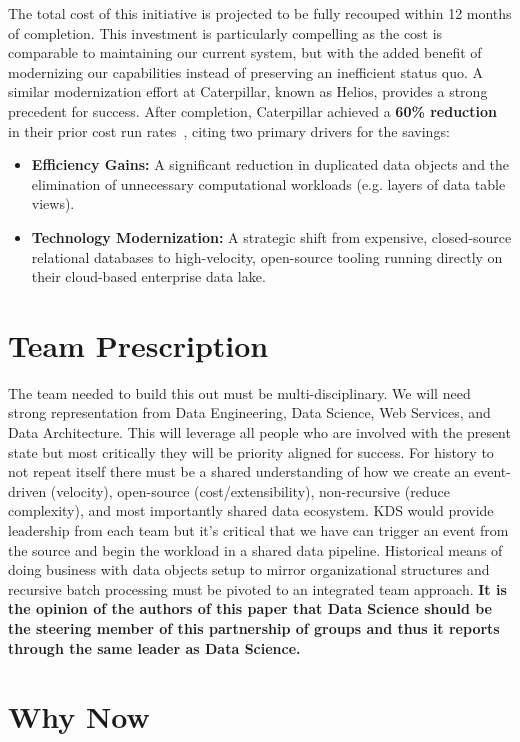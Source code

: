 \documentclass{article}
\begin{document}
The total cost of this initiative is projected to be fully recouped within 12 months of completion. This investment is particularly compelling as the cost is comparable to maintaining our current system, but with the added benefit of modernizing our capabilities instead of preserving an inefficient status quo.  A similar modernization effort at Caterpillar, known as Helios, provides a strong precedent for success. After completion, Caterpillar achieved a \textbf{60\% reduction} in their prior cost run rates~\cite{helios2025}, citing two primary drivers for the savings:
        \begin{itemize}
            \item \textbf{Efficiency Gains:} A significant reduction in duplicated data objects and the elimination of unnecessary computational workloads (e.g. layers of data table views).
            \item \textbf{Technology Modernization:} A strategic shift from expensive, closed-source relational databases to high-velocity, open-source tooling running directly on their cloud-based enterprise data lake.
        \end{itemize}
\section{Team Prescription}


The team needed to build this out must be multi-disciplinary.  We will need strong representation from Data Engineering, Data Science, Web Services, and Data Architecture.  This will leverage all people who are involved with the present state but most critically they will be priority aligned for success.  For history to not repeat itself there must be a shared understanding of how we create an event-driven (velocity), open-source (cost/extensibility), non-recursive (reduce complexity), and most importantly shared data ecosystem.  KDS would provide leadership from each team but it's critical that we have can trigger an event from the source and begin the workload in a shared data pipeline.  Historical means of doing business with data objects setup to mirror organizational structures and recursive batch processing must be pivoted to an integrated team approach.  \textbf{It is the opinion of the authors of this paper that Data Science should be the steering member of this partnership of groups and thus it reports through the same leader as Data Science.}

\section{Why Now}
\end{document}
